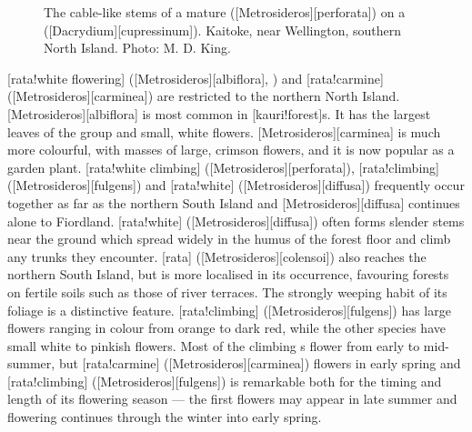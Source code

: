 {\begin{figure}[!t]
\begin{minipage}[t]{0.9\textwidth}
\begin{minipage}[t]{(\textwidth-\fgap) * \real{0.537}}
				\caption[A mature \emph{Metrosideros perforata} on a rimu]{The cable-like stems of a mature  ([Metrosideros][perforata]) on a  ([Dacrydium][cupressinum]). Kaitoke, near Wellington, southern North Island. Photo: M. D. King.}%
				\label{fig:31perforata}
			\end{minipage}
		\end{minipage}
	\end{figure}
}

[rata!white flowering] ([Metrosideros][albiflora], ) and [rata!carmine] ([Metrosideros][carminea]) are restricted to the northern North Island. [Metrosideros][albiflora] is most common in [kauri!forest]s.
It has the largest leaves of the group and small, white flowers. [Metrosideros][carminea] is much more colourful, with masses of large, crimson flowers, and it is now popular as a garden plant.
[rata!white climbing] ([Metrosideros][perforata]), [rata!climbing] ([Metrosideros][fulgens]) and [rata!white] ([Metrosideros][diffusa]) frequently occur together as far as the northern South Island and [Metrosideros][diffusa] continues alone to Fiordland.
[rata!white] ([Metrosideros][diffusa]) often forms slender stems near the ground which spread widely in the humus of the forest floor and climb any trunks they encounter.
[rata] ([Metrosideros][colensoi]) also reaches the northern South Island, but is more localised in its occurrence, favouring forests on fertile soils such as those of river terraces.
The strongly weeping habit of its foliage is a distinctive feature.
[rata!climbing] ([Metrosideros][fulgens]) has large flowers ranging in colour from orange to dark red, while the other species have small white to pinkish flowers.
Most of the climbing s flower from early to mid-summer, but [rata!carmine] ([Metrosideros][carminea]) flowers in early spring and [rata!climbing] ([Metrosideros][fulgens]) is remarkable both for the timing and length of its flowering season --- the first flowers may appear in late summer and flowering continues through the winter into early spring.

